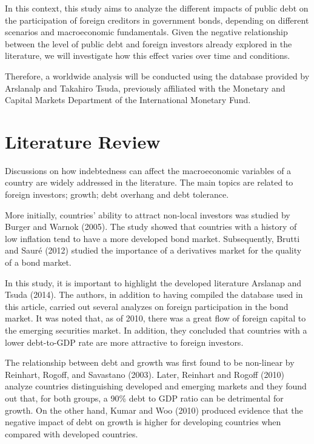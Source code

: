 \documentclass[
]{article}
\begin{document}
In this context, this study aims to analyze the different impacts of
public debt on the participation of foreign creditors in government
bonds, depending on different scenarios and macroeconomic fundamentals.
Given the negative relationship between the level of public debt and
foreign investors already explored in the literature, we will
investigate how this effect varies over time and conditions.

Therefore, a worldwide analysis will be conducted using the database
provided by Arslanalp and Takahiro Tsuda, previously affiliated with the
Monetary and Capital Markets Department of the International Monetary
Fund.

\hypertarget{literature-review}{%
\section{Literature Review}\label{literature-review}}

Discussions on how indebtedness can affect the macroeconomic variables
of a country are widely addressed in the literature. The main topics are
related to foreign investors; growth; debt overhang and debt tolerance.

More initially, countries' ability to attract non-local investors was
studied by Burger and Warnok (2005). The study showed that countries
with a history of low inflation tend to have a more developed bond
market. Subsequently, Brutti and Sauré (2012) studied the importance of
a derivatives market for the quality of a bond market.

In this study, it is important to highlight the developed literature
Arslanap and Tsuda (2014). The authors, in addition to having compiled
the database used in this article, carried out several analyzes on
foreign participation in the bond market. It was noted that, as of 2010,
there was a great flow of foreign capital to the emerging securities
market. In addition, they concluded that countries with a lower
debt-to-GDP rate are more attractive to foreign investors.

The relationship between debt and growth was first found to be
non-linear by Reinhart, Rogoff, and Savastano (2003). Later, Reinhart
and Rogoff (2010) analyze countries distinguishing developed and
emerging markets and they found out that, for both groups, a 90\% debt
to GDP ratio can be detrimental for growth. On the other hand, Kumar and
Woo (2010) produced evidence that the negative impact of debt on growth
is higher for developing countries when compared with developed
countries.
\end{document}
